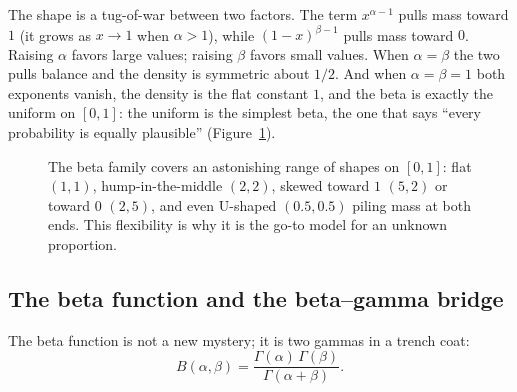 The shape is a tug-of-war between two factors. The term $x^{\alpha-1}$ pulls
mass toward $1$ (it grows as $x\to1$ when $\alpha>1$), while $(1-x)^{\beta-1}$
pulls mass toward $0$. Raising $\alpha$ favors large values; raising $\beta$
favors small values. When $\alpha=\beta$ the two pulls balance and the density
is symmetric about $1/2$. And when $\alpha=\beta=1$ both exponents vanish, the
density is the flat constant $1$, and the beta is exactly the uniform on
$[0,1]$: the uniform is the simplest beta, the one that says ``every probability
is equally plausible'' (Figure~\ref{ch11:fig-beta}).

\begin{figure}[H]
\centering
{}
\caption{The beta family covers an astonishing range of shapes on $[0,1]$:
flat $(1,1)$, hump-in-the-middle $(2,2)$, skewed toward $1$ $(5,2)$ or toward
$0$ $(2,5)$, and even U-shaped $(0.5,0.5)$ piling mass at both ends. This
flexibility is why it is the go-to model for an unknown proportion.}
\label{ch11:fig-beta}
\end{figure}

\subsection{The beta function and the beta--gamma bridge}

The beta function is not a new mystery; it is two gammas in a trench coat:
\[
  B(\alpha,\beta) = \frac{\Gamma(\alpha)\,\Gamma(\beta)}{\Gamma(\alpha+\beta)}.
\]

